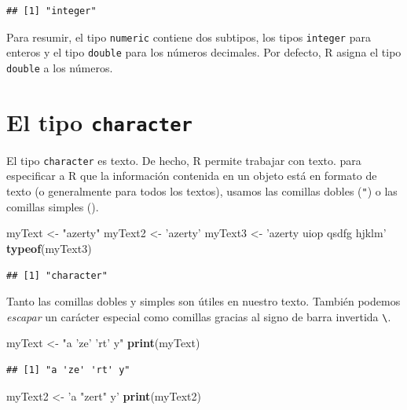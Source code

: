 \documentclass[]{book}
\newenvironment{Shaded}{\begin{snugshade}}{\end{snugshade}}
\newcommand{\KeywordTok}[1]{\textcolor[rgb]{0.13,0.29,0.53}{\textbf{#1}}}
\newcommand{\StringTok}[1]{\textcolor[rgb]{0.31,0.60,0.02}{#1}}
\newcommand{\NormalTok}[1]{#1}
\begin{document}
\begin{verbatim}
## [1] "integer"
\end{verbatim}

Para resumir, el tipo \texttt{numeric} contiene dos subtipos, los tipos
\texttt{integer} para enteros y el tipo \texttt{double} para los números
decimales. Por defecto, R asigna el tipo \texttt{double} a los números.

\section{\texorpdfstring{El tipo
\texttt{character}}{El tipo character}}\label{el-tipo-character}

El tipo \texttt{character} es texto. De hecho, R permite trabajar con
texto. para especificar a R que la información contenida en un objeto
está en formato de texto (o generalmente para todos los textos), usamos
las comillas dobles (\texttt{"}) o las comillas simples
(\texttt{\textquotesingle{}}).

\begin{Shaded}
\begin{Highlighting}[]
\NormalTok{myText <-}\StringTok{ "azerty"}
\NormalTok{myText2 <-}\StringTok{ 'azerty'}
\NormalTok{myText3 <-}\StringTok{ 'azerty uiop qsdfg hjklm'}
\KeywordTok{typeof}\NormalTok{(myText3)}
\end{Highlighting}
\end{Shaded}

\begin{verbatim}
## [1] "character"
\end{verbatim}

Tanto las comillas dobles y simples son útiles en nuestro texto. También
podemos \emph{escapar} un carácter especial como comillas gracias al
signo de barra invertida \texttt{\textbackslash{}}.

\begin{Shaded}
\begin{Highlighting}[]
\NormalTok{myText <-}\StringTok{ "a 'ze' 'rt' y"}
\KeywordTok{print}\NormalTok{(myText)}
\end{Highlighting}
\end{Shaded}

\begin{verbatim}
## [1] "a 'ze' 'rt' y"
\end{verbatim}

\begin{Shaded}
\begin{Highlighting}[]
\NormalTok{myText2 <-}\StringTok{ 'a "zert" y'}
\KeywordTok{print}\NormalTok{(myText2)}
\end{Highlighting}
\end{Shaded}
\end{document}
